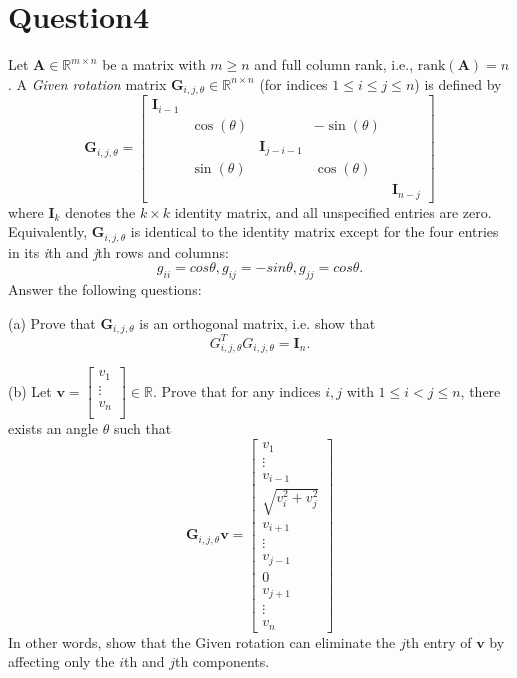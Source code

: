 \documentclass{article}
\newcommand{\R}{\mathbb{R}}
\begin{document}
\section*{Question4}
Let \(\bm{A} \in \R^{m \times n}\) be a matrix with \(m \geq n\) and full column rank, i.e., \(\text{rank}(\bm{A}) = n\). A \textit{Given rotation} matrix \(\bm{G}_{i, j, \theta} \in \R^{n \times n}\) (for indices \(1 \leq i \leq j \leq n\)) is defined by
\[
    \bm{G}_{i, j, \theta} = \begin{bmatrix}
        \bm{I}_{i-1} &  &  &  &  \\
                     & \cos(\theta) &  & -\sin(\theta) & \\
                     & & \bm{I}_{j - i - 1}& & \\
         & \sin(\theta) && \cos(\theta) &\\
         & &&& \bm{I}_{n-j}
    \end{bmatrix}
\]
where \(\bm{I}_k\) denotes the \(k \times k\) identity matrix, and all unspecified entries are zero. 
Equivalently, \(\bm{G}_{i, j, \theta}\) is identical to the identity matrix except for the four entries in its \textit{i}th and \textit{j}th rows and columns:
\[
    g_{ii} = cos\theta, g_{ij} = -sin\theta, g_{jj} = cos\theta.
\] 
Answer the following questions:

(a) Prove that \(\bm{G}_{i,j,\theta}\) is an orthogonal matrix, i.e. show that
\[
    G_{i,j,\theta}^TG_{i,j,\theta} = \bm{I}_n.
\]

(b) Let \(\bm{v} = \begin{bmatrix}
    v_1 \\
    \vdots \\
    v_n \\
\end{bmatrix} \in \R\). Prove that for any indices \(i, j\) with \(1 \leq i < j \leq n\), there exists an angle \(\theta\) such that
\[
    \bm{G}_{i,j,\theta}\bm{v} = \begin{bmatrix}
        v_1 \\
        \vdots \\
        v_{i-1} \\
        \sqrt{v_i^2 + v_j^2} \\
        v_{i+1} \\
        \vdots \\
        v_{j-1} \\
        0 \\
        v_{j+1} \\
        \vdots \\
        v_n
    \end{bmatrix}
\]
In other words, show that the Given rotation can eliminate the \(j\)th entry of \(\bm{v}\) by affecting only the \(i\)th and \(j\)th components.
\end{document}
